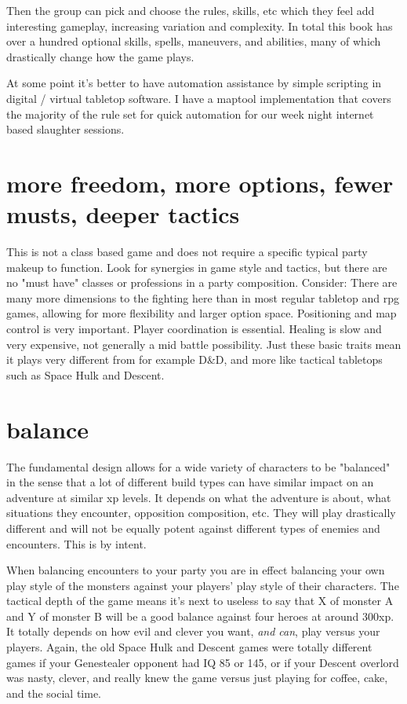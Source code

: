 Then the group can pick and choose the rules, skills, etc which they feel add interesting gameplay, increasing variation and complexity. In total this book has over a hundred optional skills, spells, maneuvers, and abilities, many of which drastically change how the game plays.

At some point it's better to have automation assistance by simple scripting in digital / virtual tabletop software. I have a maptool implementation that covers the majority of the rule set for quick automation for our week night internet based slaughter sessions.


\section*{more freedom, more options, fewer musts, deeper tactics}
This is not a class based game and does not require a specific typical party makeup to function. Look for synergies in game style and tactics, but there are no "must have" classes or professions in a party composition. Consider: There are many more dimensions to the fighting here than in most regular tabletop and rpg games, allowing for more flexibility and larger option space. Positioning and map control is very important. Player coordination is essential. Healing is slow and very expensive, not generally a mid battle possibility. Just these basic traits mean it plays very different from for example D\&D, and more like tactical tabletops such as Space Hulk and Descent.


\section*{balance}
The fundamental design allows for a wide variety of characters to be "balanced" in the sense that a lot of different build types can have similar impact on an adventure at similar xp levels. It depends on what the adventure is about, what situations they encounter, opposition composition, etc. They will play drastically different and will not be equally potent against different types of enemies and encounters. This is by intent.

When balancing encounters to your party you are in effect balancing your own play style of the monsters against your players' play style of their characters. The tactical depth of the game means it's next to useless to say that X of monster A and Y of monster B will be a good balance against four heroes at around 300xp. It totally depends on how evil and clever you want, \emph{and can}, play versus your players. Again, the old Space Hulk and Descent games were totally different games if your Genestealer opponent had IQ 85 or 145, or if your Descent overlord was nasty, clever, and really knew the game versus just playing for coffee, cake, and the social time.

